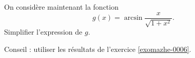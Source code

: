 
\begin{exercice}\label{exomazhe-0007}

	On considère maintenant la fonction
	\begin{equation}
		g(x)=\arcsin\frac{ x }{ \sqrt{1+x^2} }.
	\end{equation}
	Simplifier l'expression de $g$.

	Conseil : utiliser les résultats de l'exercice \ref{exomazhe-0006}.

\end{exercice}
